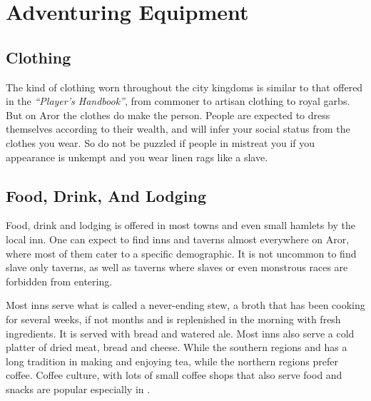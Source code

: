 \chapter{Adventuring Equipment}
\label{sec:Adventuring Equipment}



\section{Clothing}
\label{sec:Clothing}

The kind of clothing worn throughout the city kingdoms is similar to that
offered in the \emph{``Player's Handbook''}, from commoner to artisan clothing
to royal garbs. But on Aror the clothes do make the person. People are expected
to dress themselves according to their wealth, and will infer your social
status from the clothes you wear. So do not be puzzled if people in
 mistreat you if you appearance is unkempt and you wear
linen rags like a slave.









\section{Food, Drink, And Lodging}
\label{sec:Food}

Food, drink and lodging is offered in most towns and even small hamlets by
the local inn. One can expect to find inns and taverns almost everywhere on
Aror, where most of them cater to a specific demographic. It is not uncommon
to find slave only taverns, as well as taverns where slaves or even monstrous
races are forbidden from entering.

Most inns serve what is called a never-ending stew, a broth that has been
cooking for several weeks, if not months and is replenished in the morning
with fresh ingredients. It is served with bread and watered ale. Most inns
also serve a cold platter of dried meat, bread and cheese. While the southern
regions and  has a long tradition in making and enjoying
tea, while the northern regions prefer coffee. Coffee culture, with lots of
small coffee shops that also serve food and snacks are popular especially
in .

